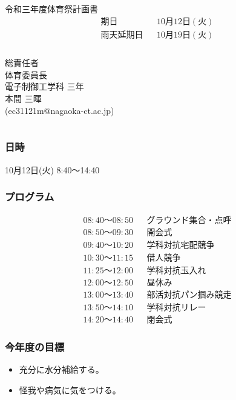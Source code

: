 \documentclass[titlepage]{jarticle}
\begin{document}
 \begin{titlepage}
  \begin{center}
   \vspace*{100truept}
   {\Large 令和三年度体育祭計画書}\\
   \vspace{10truept}
   \begin{eqnarray*}
    期日&&10月12日(火)\\
    雨天延期日&&10月19日(火)\\
   \end{eqnarray*}
   \\
   \vspace{250truept}
   {\large 総責任者}\\
   \vspace{10truept}
   体育委員長\\
   \vspace{10truept}
   電子制御工学科 三年\\
   \vspace{10truept}
   本間 三暉\\
   \vspace{10truept}
   (ec31121m@nagaoka-ct.ac.jp)
  \end{center}
 \end{titlepage}
 \part*{}
 \section{日時}
  10月12日(火) 8:40～14:40
 \section{プログラム}
  \begin{eqnarray*}
   08:40～08:50&&グラウンド集合・点呼\\
   08:50～09:30&&開会式\\
   09:40～10:20&&学科対抗宅配競争\\
   10:30～11:15&&借人競争\\
   11:25～12:00&&学科対抗玉入れ\\
   12:00～12:50&&昼休み\\
   13:00～13:40&&部活対抗パン掴み競走\\
   13:50～14:10&&学科対抗リレー\\
   14:20～14:40&&閉会式
  \end{eqnarray*}
 \section{今年度の目標}
   \begin{itemize}
    \item 充分に水分補給する。\\
    \item 怪我や病気に気をつける。\\
   \end{itemize}
\end{document}
